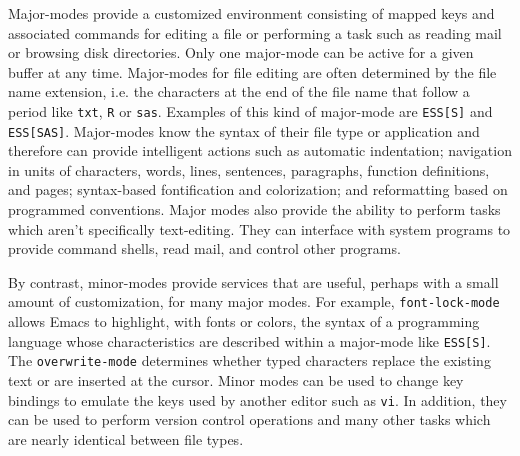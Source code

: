 \documentclass{article}
\newcommand{\stexttt}[1]{{\small\texttt{#1}}}
\newcommand{\ssf}[1]{{\small\sf{#1}}}
\begin{document}
Major-modes provide a customized environment consisting of mapped keys
and associated commands for editing a file or performing a task such
as reading mail or browsing disk directories.
Only one major-mode can be active for a given buffer at any time.
Major-modes for file editing are often determined by the file name
extension, i.e. the characters at the end of the file name that follow
a period like \stexttt{txt}, \stexttt{R} or \stexttt{sas}.  Examples
of this kind of major-mode are \stexttt{ESS[S]} and
\stexttt{ESS[SAS]}.  Major-modes know the syntax of their file type or
application and therefore can provide intelligent actions such as
automatic indentation; navigation in units of characters, words,
lines, sentences, paragraphs, function definitions, and pages;
syntax-based fontification and colorization; and reformatting based on
programmed conventions.
Major modes also provide the ability to perform tasks which aren't
specifically text-editing.  They can interface with system programs to
provide command shells, read mail, and control other programs. 

By contrast, minor-modes provide services that are useful, perhaps
with a small amount of customization, for many major modes.  For
example, \stexttt{font-lock-mode} allows Emacs to highlight, with
fonts or colors, the syntax of a programming language whose
characteristics are described within a major-mode like \stexttt{ESS[S]}.
The \stexttt{overwrite-mode}
determines whether typed characters replace the existing text or are
inserted at the cursor. Minor modes can be used to change key bindings
to emulate the keys used by another editor such as \stexttt{vi}.  In
addition, they can be used to
perform version control operations and many other tasks which are
nearly identical between file types.
\end{document}
